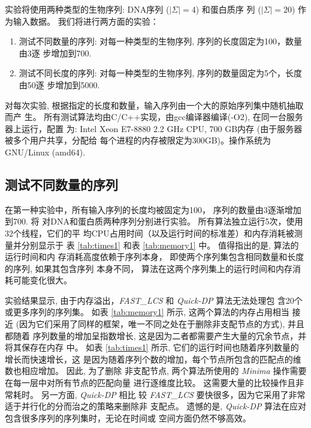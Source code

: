 \documentclass[utf8]{frontiersSCNS} %
\begin{document}
实验将使用两种类型的生物序列: DNA序列 ($|\Sigma|=4$) 和蛋白质序
列 ($|\Sigma|=20$) 作为输入数据。 我们将进行两方面的实验：

\begin{enumerate}
\item 测试不同数量的序列: 对每一种类型的生物序列, 序列的长度固定为100，数量由3逐
  步增加到700.
\item 测试不同长度的序列: 对每一种类型的生物序列, 序列的数量固定为5个，长度由50逐
  步增加到5000.
\end{enumerate}

对每次实验, 根据指定的长度和数量，输入序列由一个大的原始序列集中随机抽取而产
生。 所有测试算法均由C/C++实现，由gcc编译器编译(-O2), 在同一台服务器上运行，配置
为: Intel Xeon E7-8880 2.2 GHz CPU, 700 GB内存 (由于服务器被多个用户共享，分配给
每个进程的内存被限定为300GB)。操作系统为 GNU/Linux (amd64).

\subsection{测试不同数量的序列}
\label{sec:number}

在第一种实验中，所有输入序列的长度均被固定为100， 序列的数量由3逐渐增加到700. 将
对DNA和蛋白质两种序列分别进行实验。 所有算法独立运行5次，使用32个线程，它们的平
均CPU占用时间（以及运行时间的标准差）和内存消耗被测量并分别显示于
表 \ref{tab:times1} 和表 \ref{tab:memory1} 中。 值得指出的是, 算法的运行时间和内
存消耗高度依赖于序列本身， 即使两个序列集包含相同数量和长度的序列, 如果其包含序列
本身不同， 算法在这两个序列集上的运行时间和内存消耗可能变化很大。

实验结果显示, 由于内存溢出，\emph{FAST\_LCS} 和 \emph{Quick-DP} 算法无法处理包
含20个或更多序列的序列集。 如表 \ref{tab:memory1} 所示, 这两个算法的内存占用相当
接近 (因为它们采用了同样的框架，唯一不同之处在于删除非支配节点的方式), 并且都随着
序列数量的增加呈指数增长, 这是因为二者都需要产生大量的冗余节点，并将其保存在内存
中。 如表 \ref{tab:times1} 所示, 它们的运行时间也随着序列数量的增长而快速增长，这
是因为随着序列个数的增加，每个节点所包含的匹配点的维数也相应增加。 因此, 为了删除
非支配节点, 两个算法所使用的 \emph{Minima} 操作需要在每一层中对所有节点的匹配向量
进行逐维度比较。 这需要大量的比较操作且非常耗时。 另一方面, \emph{Quick-DP} 相比
较 \emph{FAST\_LCS} 要快很多，因为它采用了非常适于并行化的分而治之的策略来删除非
支配点。 遗憾的是, \emph{Quick-DP} 算法在应对包含很多序列的序列集时，无论在时间或
空间方面仍然不够高效。
\end{document}

